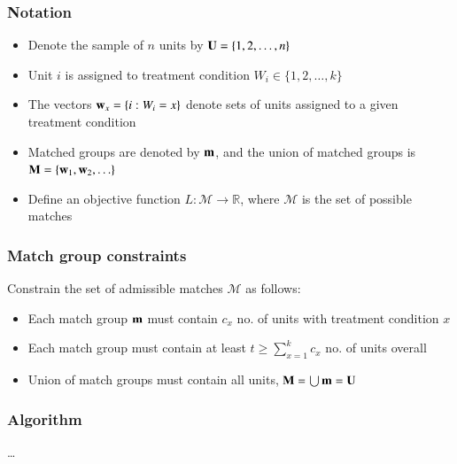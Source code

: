 
\begin{frame}
  \frametitle{Notation}
  
  \begin{itemize}
  \item Denote the sample of $n$ units by $\mathbf{U} = \{1,2,\ldots,n\}$    \medskip 
  \item Unit $i$ is assigned to treatment condition
    $W_i \in \{1,2,\ldots,k\}$ \medskip 
  \item The vectors $\mathbf{w}_x = \{i : W_i = x\}$ denote sets of units
    assigned to a given treatment condition \medskip 
  \item Matched groups are denoted by $\mathbf{m}$, and the union of matched
    groups is $\mathbf{M} = \{\mathbf{w}_1, \mathbf{w}_2, \ldots \}$ \medskip 
  \item Define an objective function
    $L: \mathcal{M} \rightarrow \mathbb{R}$, where $\mathcal{M}$ is
    the set of possible matches
  \end{itemize}


\end{frame}


\begin{frame}
  \frametitle{Match group constraints}

  Constrain the set of admissible matches $\mathcal{M}$ as follows:

  \medskip 

  \begin{itemize}
  \item Each match group $\mathbf{m}$ must contain $c_x$ no. of units with
    treatment condition $x$ \medskip 
  \item Each match group must contain at least $t \geq \sum_{x=1}^{k}
    c_x$ no. of units overall \medskip 
  \item Union of match groups must contain all units, $\mathbf{M} = \bigcup \mathbf{m} = \mathbf{U}$
  \end{itemize}
  
\end{frame}


\begin{frame}
  \frametitle{Algorithm}
  
  \ldots
  
\end{frame}


